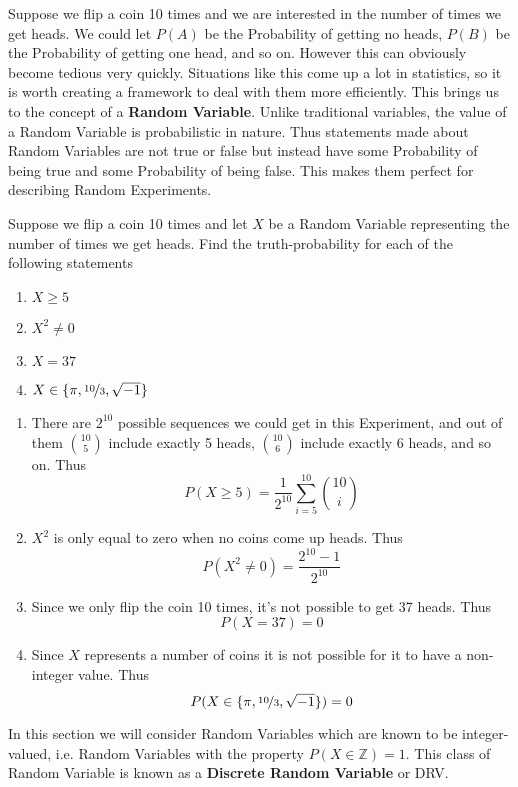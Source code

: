 \documentclass{report}
\begin{document}
Suppose we flip a coin 10 times and we are interested in the number of times we get heads. We could let $P(A)$ be the Probability of getting no heads, $P(B)$ be the Probability of getting one head, and so on. However this can obviously become tedious very quickly. Situations like this come up a lot in statistics, so it is worth creating a framework to deal with them more efficiently. This brings us to the concept of a \textbf{Random Variable}. Unlike traditional variables, the value of a Random Variable is probabilistic in nature. Thus statements made about Random Variables are not true or false but instead have some Probability of being true and some Probability of being false. This makes them perfect for describing Random Experiments. 
\begin{example}
    Suppose we flip a coin 10 times and let $X$ be a Random Variable representing the number of times we get heads. Find the truth-probability for each of the following statements
    \begin{enumerate}
        \item $X\ge 5$
        \item $X^2\ne 0$ 
        \item $X=37$
        \item $X\in\{\pi, \nicefrac{10} 3, \sqrt {-1}\}$
    \end{enumerate}
    \solution
    \begin{enumerate}
        \item There are $2^{10}$ possible sequences we could get in this Experiment, and out of them $\binom {10} 5$ include exactly 5 heads, $\binom {10} 6$ include exactly 6 heads, and so on. Thus
        \[
            P(X\ge 5) = \frac 1 {2^{10}} \sum_{i=5}^{10} \binom {10} i
        \]
        \item $X^2$ is only equal to zero when no coins come up heads. Thus
        \[
            P(X^2\ne 0) = \frac{2^{10}-1}{2^{10}}
        \]
        \item Since we only flip the coin 10 times, it's not possible to get 37 heads. Thus
        \[
            P(X=37)=0
        \]
        \item Since $X$ represents a number of coins it is not possible for it to have a non-integer value. Thus
        \[
            P(X\in\{\pi, \nicefrac{10} 3, \sqrt {-1}\})=0
        \]
    \end{enumerate}
\end{example}
In this section we will consider Random Variables which are known to be integer-valued, i.e. Random Variables with the property $P(X\in\mathbb Z)=1$. This class of Random Variable is known as a \textbf{Discrete Random Variable} or DRV.
\end{document}
